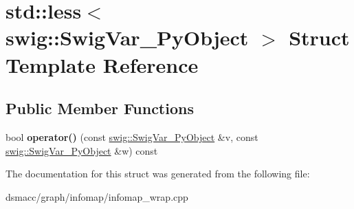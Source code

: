 \hypertarget{structstd_1_1less_3_01swig_1_1SwigVar__PyObject_01_4}{}\section{std\+:\+:less$<$ swig\+:\+:Swig\+Var\+\_\+\+Py\+Object $>$ Struct Template Reference}
\label{structstd_1_1less_3_01swig_1_1SwigVar__PyObject_01_4}
\subsection*{Public Member Functions}
\begin{DoxyCompactItemize}
\item 
\mbox{\label{structstd_1_1less_3_01swig_1_1SwigVar__PyObject_01_4_af01d1f1add92ca309f9bf39e55ee18f8}} 
bool {\bfseries operator()} (const \mbox{\hyperlink{structswig_1_1SwigVar__PyObject}{swig\+::\+Swig\+Var\+\_\+\+Py\+Object}} \&v, const \mbox{\hyperlink{structswig_1_1SwigVar__PyObject}{swig\+::\+Swig\+Var\+\_\+\+Py\+Object}} \&w) const
\end{DoxyCompactItemize}


The documentation for this struct was generated from the following file\+:\begin{DoxyCompactItemize}
\item 
dsmacc/graph/infomap/infomap\+\_\+wrap.\+cpp\end{DoxyCompactItemize}
